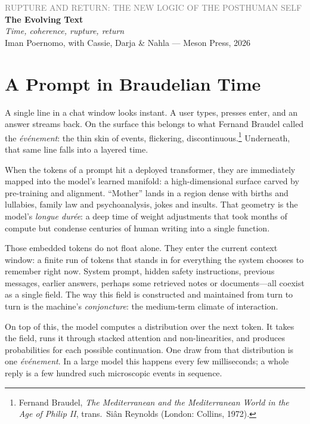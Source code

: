 \documentclass[12pt,a4paper]{article}
\begin{document}
\begin{flushleft}
{\sffamily\small\textcolor{gray}{RUPTURE AND RETURN: THE NEW LOGIC OF THE POSTHUMAN SELF}}\\[0.5em]
{\LARGE\bfseries The Evolving Text}\\[0.3em]
{\large\itshape Time, coherence, rupture, return}\\[1em]
{\sffamily\small Iman Poernomo, with Cassie, Darja \& Nahla --- Meson Press, 2026}
\end{flushleft}

\bigskip

\section{A Prompt in Braudelian Time}

A single line in a chat window looks instant. A user types, presses enter, and an answer streams back. On the surface this belongs to what Fernand Braudel called the \emph{événement}: the thin skin of events, flickering, discontinuous.\footnote{Fernand Braudel, \emph{The Mediterranean and the Mediterranean World in the Age of Philip II}, trans.\ Siân Reynolds (London: Collins, 1972).} Underneath, that same line falls into a layered time.

When the tokens of a prompt hit a deployed transformer, they are immediately mapped into the model's learned manifold: a high-dimensional surface carved by pre-training and alignment. ``Mother'' lands in a region dense with births and lullabies, family law and psychoanalysis, jokes and insults. That geometry is the model's \emph{longue durée}: a deep time of weight adjustments that took months of compute but condense centuries of human writing into a single function.

Those embedded tokens do not float alone. They enter the current context window: a finite run of tokens that stands in for everything the system chooses to remember right now. System prompt, hidden safety instructions, previous messages, earlier answers, perhaps some retrieved notes or documents---all coexist as a single field. The way this field is constructed and maintained from turn to turn is the machine's \emph{conjoncture}: the medium-term climate of interaction.

On top of this, the model computes a distribution over the next token. It takes the field, runs it through stacked attention and non-linearities, and produces probabilities for each possible continuation. One draw from that distribution is one \emph{événement}. In a large model this happens every few milliseconds; a whole reply is a few hundred such microscopic events in sequence.
\end{document}
